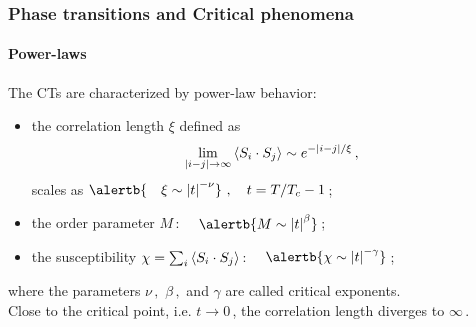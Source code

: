 \begin{frame}
\frametitle{Phase transitions and Critical phenomena}
\framesubtitle{Power-laws}
The CTs are characterized by power-law behavior:\\
$ $\\
\begin{itemize}
\item the correlation length $\xi$ defined as 
\[
\lim_{\abs*{i-j}\to \infty}\braket{ S_i \cdot S_j}\sim e^{-\abs*{i-j}/\xi}\,,
\]
scales as $\alertb{\quad \xi \sim \abs*{t}^{-\nu}}\,\,, \quad t = T/T_c -1 \,$;
\item the order parameter $M\,$: $\quad \alertb{ M \sim \abs*{t}^\beta}\,$;
\item the susceptibility $\chi = \sum _i \braket{ S_i \cdot S_j} \,$: $\quad \alertb{ \chi \sim \abs*{t}^{-\gamma}}\,$;
\end{itemize}
$ $\\
where the parameters $\nu\,,\,\,\beta\,,$ and $\gamma$ are called critical exponents.\\ 
$ $\\
Close to the critical point, i.e. $t \to 0\,$, the correlation length diverges to $\infty\,$.
\end{frame}


